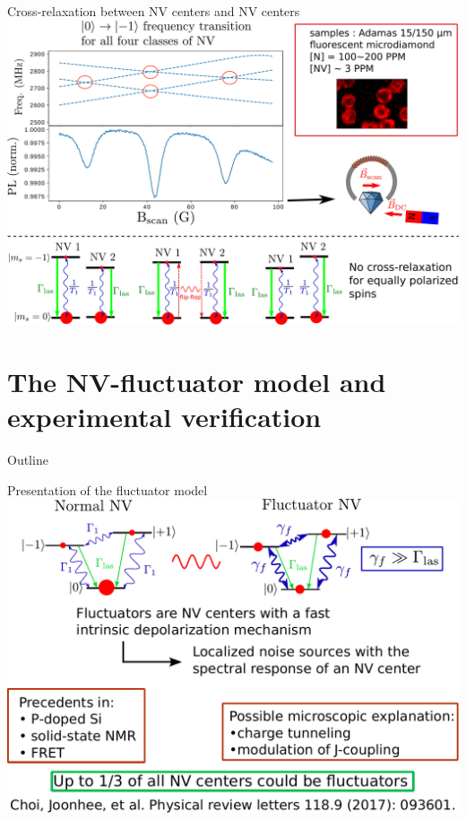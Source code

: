 \documentclass{beamer}
\begin{document}
\begin{frame}{Cross-relaxation between NV centers and NV centers}
\centering
\includegraphics[width=\textwidth,height=0.9\textheight,keepaspectratio]{Slide_CR_adamas}
\end{frame}
\section{The NV-fluctuator model and experimental verification}
\begin{frame}{Outline}
\tableofcontents[currentsection]
\end{frame}
\begin{frame}{Presentation of the fluctuator model}
\centering
\includegraphics[width=\textwidth,height=0.8\textheight,keepaspectratio]{Slide_fluct_intro}
\end{frame}
\end{document}
